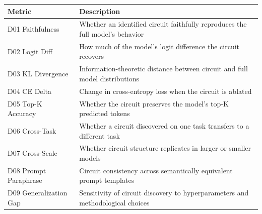 \documentclass[10pt]{article}
\begin{document}
\begin{minipage}{\linewidth}
\par
\begin{center}
\begin{tabular}{@{}lp{10cm}@{}}
\toprule
\textbf{Metric} & \textbf{Description} \\
\midrule
D01 Faithfulness & Whether an identified circuit faithfully reproduces the full model's behavior \\
\midrule
D02 Logit Diff & How much of the model's logit difference the circuit recovers \\
\midrule
D03 KL Divergence & Information-theoretic distance between circuit and full model distributions \\
\midrule
D04 CE Delta & Change in cross-entropy loss when the circuit is ablated \\
\midrule
D05 Top-K Accuracy & Whether the circuit preserves the model's top-K predicted tokens \\
\midrule
D06 Cross-Task & Whether a circuit discovered on one task transfers to a different task \\
\midrule
D07 Cross-Scale & Whether circuit structure replicates in larger or smaller models \\
\midrule
D08 Prompt Paraphrase & Circuit consistency across semantically equivalent prompt templates \\
\midrule
D09 Generalization Gap & Sensitivity of circuit discovery to hyperparameters and methodological choices \\
\bottomrule
\end{tabular}
\end{center}
\end{minipage}

\smallskip
\end{document}
